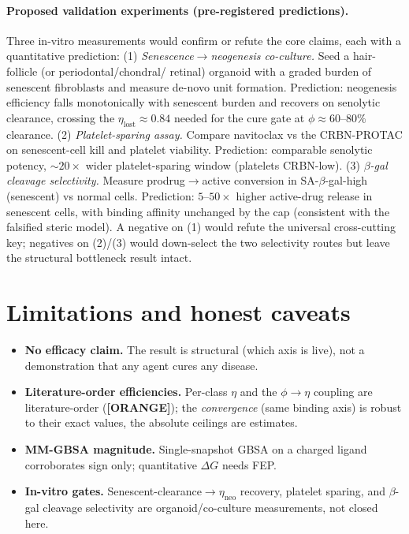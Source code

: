 \documentclass[11pt,a4paper]{article}
\newcommand{\tierbadge}[2]{\textcolor{#1}{\textbf{[#2]}}}
\providecommand{\tierOrange}{\tierbadge{orange!80!black}{ORANGE}}
\begin{document}
\paragraph{Proposed validation experiments (pre-registered predictions).} Three in-vitro
measurements would confirm or refute the core claims, each with a quantitative prediction:
(1) \emph{Senescence$\to$neogenesis co-culture.} Seed a hair-follicle (or periodontal/chondral/
retinal) organoid with a graded burden of senescent fibroblasts and measure de-novo unit
formation. Prediction: neogenesis efficiency falls monotonically with senescent burden and
recovers on senolytic clearance, crossing the $\eta_{\text{lost}}\!\approx\!0.84$ needed for
the cure gate at $\phi\!\approx\!60$--$80\%$ clearance. (2) \emph{Platelet-sparing assay.}
Compare navitoclax vs the CRBN-PROTAC on senescent-cell kill and platelet viability.
Prediction: comparable senolytic potency, ${\sim}20\times$ wider platelet-sparing window
(platelets CRBN-low). (3) \emph{$\beta$-gal cleavage selectivity.} Measure prodrug$\to$active
conversion in SA-$\beta$-gal-high (senescent) vs normal cells. Prediction: $5$--$50\times$
higher active-drug release in senescent cells, with binding affinity unchanged by the cap
(consistent with the falsified steric model). A negative on (1) would refute the universal
cross-cutting key; negatives on (2)/(3) would down-select the two selectivity routes but
leave the structural bottleneck result intact.

\section{Limitations and honest caveats}
\label{sec:limits}
\begin{itemize}\itemsep0.2em
\item \textbf{No efficacy claim.} The result is structural (which axis is live), not a
demonstration that any agent cures any disease.
\item \textbf{Literature-order efficiencies.} Per-class $\eta$ and the $\phi\to\eta$ coupling
are literature-order (\tierOrange); the \emph{convergence} (same binding axis) is robust to
their exact values, the absolute ceilings are estimates.
\item \textbf{MM-GBSA magnitude.} Single-snapshot GBSA on a charged ligand corroborates sign
only; quantitative $\Delta G$ needs FEP.
\item \textbf{In-vitro gates.} Senescent-clearance$\to\eta_{\text{neo}}$ recovery, platelet
sparing, and $\beta$-gal cleavage selectivity are organoid/co-culture measurements, not closed here.
\end{itemize}
\end{document}
